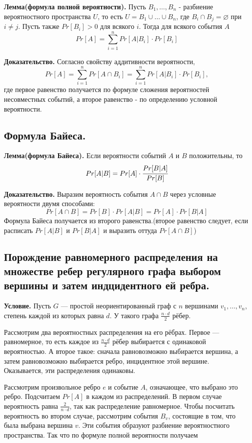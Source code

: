\documentclass[a4paper, 10pt]{article}
\begin{document}
\textbf{Лемма(формула полной вероятности).} Пусть $B_1, \dots, B_n$ - разбиение вероятностного пространства $U$, то есть $U = B_1 \cup \dots \cup B_n$, где $B_i \cap B_j = \varnothing$ при $i \neq j$. Пусть также $Pr[B_i] > 0$ для всякого $i$. Тогда для всякого события $A$ $$Pr[A] = \sum^n_{i = 1}Pr[A|B_i] \cdot Pr[B_i]$$

\textbf{Доказательство.} Согласно свойству аддитивности вероятности, $$Pr[A] = \sum^n_{i=1}Pr[A \cap B_i] = \sum^n_{i=1}Pr[A|B_i] \cdot Pr[B_i],$$ где первое равенство получается по формуле сложения вероятностей несовместных событий, а второе равенство - по определению условной вероятности.

\subsection{Формула Байеса.}

\textbf{Лемма(формула Байеса).} Если вероятности событий $A$ и $B$ положительны, то $$Pr[A|B] = Pr[A] \cdot \cfrac{Pr[B|A]}{Pr[B]}$$

\textbf{Доказательство.} Выразим вероятность события $A \cap B$ через условные вероятности двумя способами: $$Pr[A \cap B] = Pr[B] \cdot Pr[A|B] = Pr[A] \cdot Pr[B|A]$$ Формула Байеса получается из второго равенства.(второе равенство следует, если расписать $Pr[A|B]$ и $Pr[B|A]$ и выразить оттуда $Pr[A \cap B]$)

\subsection{Порождение равномерного распределения на множестве ребер регулярного графа выбором вершины и затем индцидентного ей ребра.}

\textbf{Условие.} Пусть $G$ — простой неориентированный граф с $n$ вершинами $v_1, \dots, v_n$, степень каждой из которых равна $d$. У такого графа $\frac{n \cdot d}{2}$ рёбер.

Рассмотрим два вероятностных распределения на его рёбрах. Первое — равномерное, то есть каждое из $\frac{n \cdot d}{2}$ рёбер выбирается с одинаковой вероятностью. А второе такое: сначала равновозможно выбирается вершина, а затем равновозможно выбирается ребро, инцидентное этой вершине. Оказывается, эти распределения одинаковы.

Рассмотрим произвольное ребро $e$ и событие $A$, означающее, что выбрано это ребро. Подсчитаем $Pr[A]$ в каждом из распределений. В первом случае вероятность равна $\frac{2}{n \cdot d}$, так как распределение равномерное. Чтобы посчитать вероятность во втором случае, рассмотрим события $B_v$, состоящие в том, что была выбрана вершина $v$. Эти события образуют разбиение вероятностного пространства. Так что по формуле полной вероятности получаем
\end{document}
